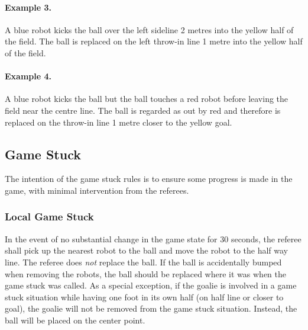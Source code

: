 \documentclass[12pt]{article}
\begin{document}
\paragraph{Example 3.} A blue robot kicks the ball over the left
sideline 2 metres into the yellow half of the field. The ball is
replaced on the left throw-in line 1 metre into the yellow half of the field.


\paragraph{Example 4.} A blue robot kicks the ball but the ball
touches a red robot before leaving the field near the centre line.
The ball is regarded as out by red and therefore
is replaced on the throw-in line 1 metre closer to the yellow goal.

\subsection{Game Stuck}

The intention of the game stuck rules is to ensure some progress is made in the game, with minimal intervention from the referees.

\subsubsection{Local Game Stuck}

In the event of no substantial change in the game state for 30
seconds, the referee shall pick up the nearest robot to the ball and move the robot
to the half way line.  The referee does \emph{not} replace the ball.
If the ball is accidentally bumped when removing the robots, the ball should be replaced where
it was when the game stuck was called.  As a special exception, if
the goalie is involved in a game stuck situation while having one foot
in its own half (on half line or closer to goal), the goalie will
not be removed from the game stuck situation. Instead, the ball will be placed on the center point.

\end{document}

